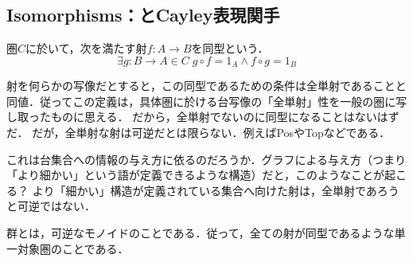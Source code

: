 \documentclass[uplatex, 12pt, dvipdfmx]{jsarticle}
\begin{document}
\subsection{Isomorphisms：とCayley表現関手}

\begin{definition}[同型]
    圏$C$に於いて，次を満たす射$f:A\to B$を同型という．
    \[ \exists g:B\to A\in C\; g\circ f=1_A \land f\circ g=1_B \]
\end{definition}
\begin{remark*}
    射を何らかの写像だとすると，この同型であるための条件は全単射であることと同値．従ってこの定義は，具体圏に於ける台写像の「全単射」性を一般の圏に写し取ったものに思える．
    だから，全単射でないのに同型になることはないはずだ．
    だが，全単射な射は可逆だとは限らない．例えばPosやTopなどである．

    これは台集合への情報の与え方に依るのだろうか．グラフによる与え方（つまり「より細かい」という語が定義できるような構造）だと，このようなことが起こる？
    より「細かい」構造が定義されている集合へ向けた射は，全単射であろうと可逆ではない．
\end{remark*}

\begin{definition}[群]
    群とは，可逆なモノイドのことである．従って，全ての射が同型であるような単一対象圏のことである．
\end{definition}
\end{document}
